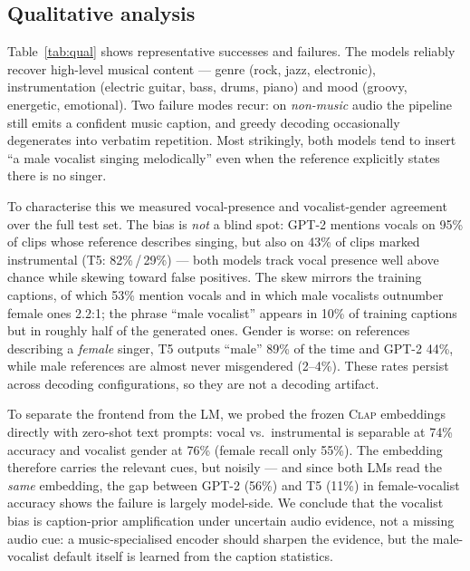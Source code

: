 \documentclass{article}
\newcommand{\clapenc}{\textsc{Clap}}
\begin{document}


\FloatBarrier
\subsection{Qualitative analysis}\label{sec:qual}
Table~\ref{tab:qual} shows representative successes and failures. The models reliably recover
high-level musical content --- genre (rock, jazz, electronic), instrumentation (electric guitar,
bass, drums, piano) and mood (groovy, energetic, emotional). Two failure modes recur: on
\emph{non-music} audio the pipeline still emits a confident music caption, and greedy decoding
occasionally degenerates into verbatim repetition. Most strikingly, both models tend to insert ``a male
vocalist singing melodically'' even when the reference explicitly states there is no singer.

To characterise this we measured vocal-presence and vocalist-gender agreement over the full
test set. The bias is \emph{not} a blind spot: GPT-2 mentions vocals on 95\% of clips whose
reference describes singing, but also on 43\% of clips marked instrumental (T5: 82\%\,/\,29\%)
--- both models track vocal presence well above chance while skewing toward false positives.
The skew mirrors the training captions, of which 53\% mention vocals and in which male
vocalists outnumber female ones 2.2:1; the phrase ``male vocalist'' appears in 10\% of training
captions but in roughly half of the generated ones. Gender is worse: on references describing a
\emph{female} singer, T5 outputs ``male'' 89\% of the time and GPT-2 44\%, while male
references are almost never misgendered (2--4\%). These rates persist across decoding
configurations, so they are not a decoding artifact.

To separate the frontend from the LM, we probed the frozen \clapenc{} embeddings directly with
zero-shot text prompts: vocal vs.\ instrumental is separable at 74\% accuracy and vocalist
gender at 76\% (female recall only 55\%). The embedding therefore carries the relevant cues,
but noisily --- and since both LMs read the \emph{same} embedding, the gap between GPT-2
(56\%) and T5 (11\%) in female-vocalist accuracy shows the failure is largely model-side. We
conclude that the vocalist bias is caption-prior amplification under uncertain audio evidence,
not a missing audio cue: a music-specialised encoder should sharpen the evidence, but the
male-vocalist default itself is learned from the caption statistics.


\end{document}
